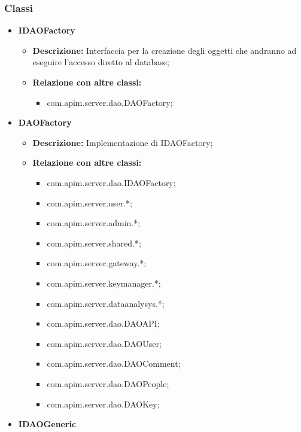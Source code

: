 {{{{{        \subsubsection{Classi}
        \begin{itemize} \itemsep1pt
          \item \textbf{IDAOFactory}
          \begin{itemize}
            \item \textbf{Descrizione:} Interfaccia per la creazione degli oggetti che andranno ad eseguire l'accesso diretto al database;
            \item \textbf{Relazione con altre classi:}
            \begin{itemize}
              \item com.apim.server.dao.DAOFactory;
            \end{itemize}
          \end{itemize}
          \item \textbf{DAOFactory}
          \begin{itemize}
            \item \textbf{Descrizione:} Implementazione di IDAOFactory;
            \item \textbf{Relazione con altre classi:}
            \begin{itemize}
              \item com.apim.server.dao.IDAOFactory;
              \item com.apim.server.user.*;
              \item com.apim.server.admin.*;
              \item com.apim.server.shared.*;
              \item com.apim.server.gateway.*;
              \item com.apim.server.keymanager.*;
              \item com.apim.server.dataanalysys.*;
              \item com.apim.server.dao.DAOAPI;
              \item com.apim.server.dao.DAOUser;
              \item com.apim.server.dao.DAOComment;
              \item com.apim.server.dao.DAOPeople;
              \item com.apim.server.dao.DAOKey;
            \end{itemize}
          \end{itemize}
          \item \textbf{IDAOGeneric}

\end{itemize}}}}}}
